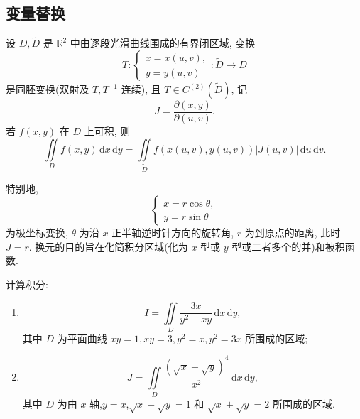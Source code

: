 \subsection{变量替换}

\begin{theorem}[\markstar]
    设 $D,\widetilde D$ 是 $\mathbb{R}^2$ 中由逐段光滑曲线围成的有界闭区域, 变换
    \[
        T:\begin{cases}
            x=x(u,v), \\
            y=y(u,v)
        \end{cases}
        :\widetilde D\to D
    \]
    是同胚变换(双射及 $T,T^{-1}$ 连续), 且 $T\in C^{(2)}(\widetilde D)$, 记
    \[
        J=\dfrac{\partial(x,y)}{\partial(u,v)}.
    \]
    若 $f(x,y)$ 在 $D$ 上可积, 则
    \[
        \displaystyle\iint\limits_Df(x,y)\,\mathrm{d}x\,\mathrm{d}y
        =\iint\limits_{\widetilde D}f\left(x(u,v),y(u,v)\right)|J(u,v)|\,\mathrm{d}u\,\mathrm{d}v.
    \]
\end{theorem}

\begin{remark}
    特别地,
    \[
        \begin{cases}
            x=r\cos\theta, \\
            y=r\sin\theta
        \end{cases}
    \]
    为极坐标变换, $\theta$ 为沿 $x$ 正半轴逆时针方向的旋转角, $r$ 为到原点的距离, 此时 $J=r$. 换元的目的旨在化简积分区域(化为 $x$ 型或 $y$ 型或二者多个的并)和被积函数.
\end{remark}

\begin{example}
    计算积分:
    \begin{enumerate}
        \item
              \[
                  I=\iint\limits_D\dfrac{3x}{y^2+xy}\,\mathrm{d}x\,\mathrm{d}y,
              \]
              其中 $D$ 为平面曲线 $xy=1,xy=3,y^2=x,y^2=3x$ 所围成的区域;
        \item
              \[
                  J=\iint\limits_D\dfrac{(\sqrt{x}+\sqrt{y})^4}{x^2}\,\mathrm{d}x\,\mathrm{d}y,
              \]
              其中 $D$ 为由 $x$ 轴,$y=x$,$\sqrt{x}+\sqrt{y}=1$ 和 $\sqrt{x}+\sqrt{y}=2$ 所围成的区域.
    \end{enumerate}
\end{example}
\exampleblank

